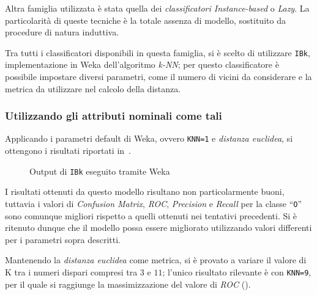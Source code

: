 Altra famiglia utilizzata è stata quella dei \emph{classificatori Instance-based} o \emph{Lazy}.
La particolarità di queste tecniche è la totale assenza di modello, sostituito da procedure di natura induttiva.

Tra tutti i classificatori disponibili in questa famiglia, si è scelto di utilizzare \texttt{IBk}, implementazione in Weka dell'algoritmo \emph{k-NN};
per questo classificatore è possibile impostare diversi parametri, come il numero di vicini da considerare e la metrica da utilizzare nel calcolo della distanza.

\subsubsection{Utilizzando gli attributi nominali come tali}\label{subsub:ibk:nominal}

Applicando i parametri default di Weka, ovvero \texttt{KNN=1} e \emph{distanza euclidea}, si ottengono i risultati riportati in~.

\begin{figure}[H]
  \centering
  \caption{Output di \texttt{IBk} eseguito tramite Weka}%
  \label{fig:ibk:1}
\end{figure}

I risultati ottenuti da questo modello risultano non particolarmente buoni, tuttavia i valori di \emph{Confusion Matrix}, \emph{ROC}, \emph{Precision} e \emph{Recall} per la classe ``\texttt{O}'' sono comunque migliori rispetto a quelli ottenuti nei tentativi precedenti.
Si è ritenuto dunque che il modello possa essere migliorato utilizzando valori differenti per i parametri sopra descritti.

Mantenendo la \emph{distanza euclidea} come metrica, si è provato a variare il valore di K tra i numeri dispari compresi tra \(3\) e \(11\);
l'unico risultato rilevante è con \texttt{KNN=9}, per il quale si raggiunge la massimizzazione del valore di \emph{ROC} ().


